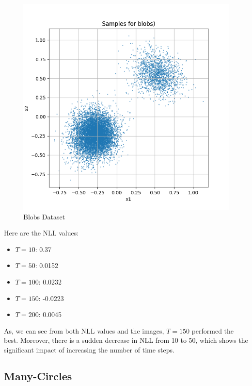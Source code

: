 \documentclass[a4paper,12pt]{article}
\begin{document}
\begin{figure}[h]
\begin{minipage}{0.3\textwidth}
  \end{minipage}
  \begin{minipage}{0.3\textwidth}
      \centering
      \includegraphics[width=\linewidth]{"images/Samples for ddpm_2_200_0.0001_0.02_blobs.png"}
  \end{minipage}

  \caption{Blobs Dataset}
\end{figure}

Here are the NLL values:
\begin{itemize}
  \item $T = 10$: 0.37
  \item $T = 50$: 0.0152
  \item $T = 100$: 0.0232
  \item $T = 150$: -0.0223
  \item $T = 200$: 0.0045
\end{itemize}

As, we can see from both NLL values and the images, $T = 150$ performed the best. Moreover, there is a sudden decrease in NLL from 10 to 50, which shows the significant impact of increasing the number of time steps.

\clearpage
\subsection*{Many-Circles}
\end{document}
